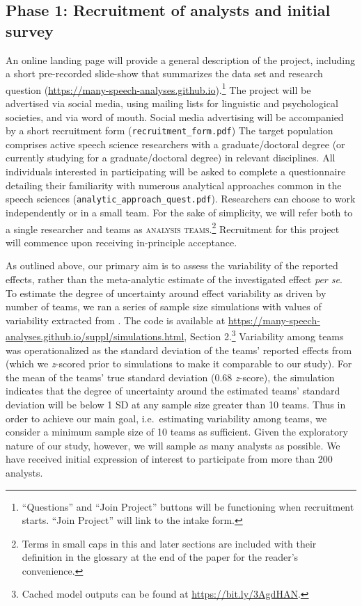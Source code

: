 \documentclass[Review,times,sageh]{sagej}
\begin{document}
\hypertarget{phase-1-recruitment-of-analysts-and-initial-survey}{%
\subsection{Phase 1: Recruitment of analysts and initial survey}\label{phase-1-recruitment-of-analysts-and-initial-survey}}

An online landing page will provide a general description of the project, including a short pre-recorded slide-show that summarizes the data set and research question (\url{https://many-speech-analyses.github.io}).\footnote{``Questions'' and ``Join Project'' buttons will be functioning when recruitment starts. ``Join Project'' will link to the intake form.}
The project will be advertised via social media, using mailing lists for linguistic and psychological societies, and via word of mouth.
Social media advertising will be accompanied by a short recruitment form (\texttt{recruitment\_form.pdf})
The target population comprises active speech science researchers with a graduate/doctoral degree (or currently studying for a graduate/doctoral degree) in relevant disciplines.
All individuals interested in participating will be asked to complete a questionnaire detailing their familiarity with numerous analytical approaches common in the speech sciences (\texttt{analytic\_approach\_quest.pdf}).
Researchers can choose to work independently or in a small team.
For the sake of simplicity, we will refer both to a single researcher and teams as \textsc{analysis teams}.\footnote{Terms in small caps in this and later sections are included with their definition in the glossary at the end of the paper for the reader's convenience.}
Recruitment for this project will commence upon receiving in-principle acceptance.

As outlined above, our primary aim is to assess the variability of the reported effects, rather than the meta-analytic estimate of the investigated effect \emph{per se}.
To estimate the degree of uncertainty around effect variability as driven by number of teams, we ran a series of sample size simulations with values of variability extracted from \citet{silberzahn2018many}.
The code is available at \url{https://many-speech-analyses.github.io/suppl/simulations.html}, Section 2.\footnote{Cached model outputs can be found at \url{https://bit.ly/3AgdHAN}.}
Variability among teams was operationalized as the standard deviation of the teams' reported effects from \citet{silberzahn2018many} (which we \emph{z}-scored prior to simulations to make it comparable to our study).
For the mean of the teams' true standard deviation (0.68 \emph{z}-score), the simulation indicates that the degree of uncertainty around the estimated teams' standard deviation will be below 1 SD at any sample size greater than 10 teams.
Thus in order to achieve our main goal, i.e.~estimating variability among teams, we consider a minimum sample size of 10 teams as sufficient.
Given the exploratory nature of our study, however, we will sample as many analysts as possible.
We have received initial expression of interest to participate from more than 200 analysts.
\end{document}
